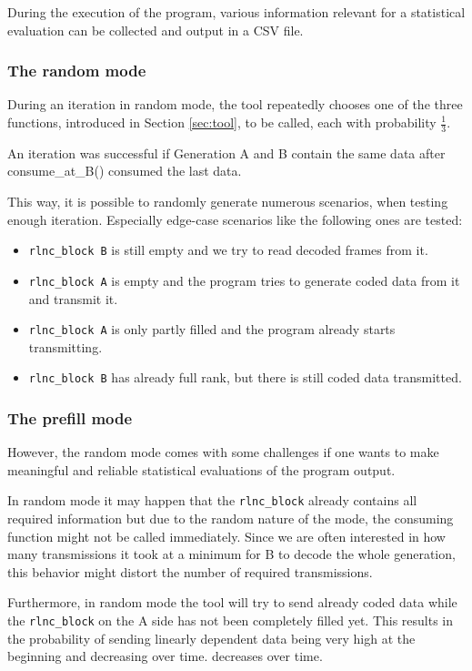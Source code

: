 \documentclass[a4paper,english,10pt]{tumarticle}
\begin{document}
During the execution of the program, various information relevant for a statistical evaluation can be collected and output in a CSV file.

\subsubsection{The random mode}\label{sec:random}
During an iteration in random mode, the tool repeatedly chooses one of the three functions, introduced in Section \ref{sec:tool}, 
to be called, each with probability $\frac{1}{3}$. 

An iteration was successful if Generation A and B contain the same data after consume\_at\_B() consumed the last data.

This way, it is possible to randomly generate numerous scenarios, when testing enough iteration. 
Especially edge-case scenarios like the following ones are tested:

\begin{itemize}
  \item \texttt{rlnc\_block B} is still empty and we try to read decoded frames from it.
  \item \texttt{rlnc\_block A} is empty and the program tries to generate coded data from it and transmit it.
  \item \texttt{rlnc\_block A} is only partly filled and the program already starts transmitting.
  \item \texttt{rlnc\_block B} has already full rank, but there is still coded data transmitted.
\end{itemize}

\subsubsection{The prefill mode}\label{sec:prefill}
However, the random mode comes with some challenges if one wants to make meaningful and reliable statistical 
evaluations of the program output.

In random mode it may happen that the \texttt{rlnc\_block} already contains all required information but due
to the random nature of the mode, the consuming function might not be called immediately.
Since we are often interested in how many transmissions it took at a minimum for B to decode the whole generation, this behavior 
might distort the number of required transmissions.

Furthermore, in random mode the tool will try to send already coded data while the \texttt{rlnc\_block} on the A side has not been completely filled yet. 
This results in the probability of sending linearly dependent data being very high at the beginning and decreasing over time. 
decreases over time.
\end{document}
